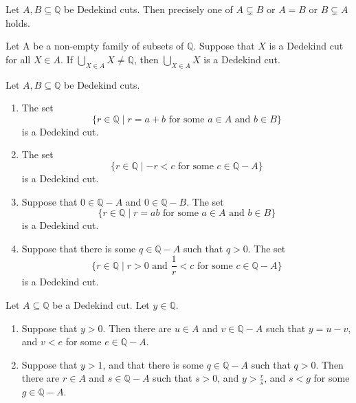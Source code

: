 \begin{lemma} %
	\label{cuts:l:trichotomy}
	Let $A, B \subseteq \mathbb{Q}$ be Dedekind cuts. Then precisely one of $A \subsetneq B$ or $A = B$ or $B \subsetneq A$ holds.
\end{lemma}

\begin{lemma} %
	Let A be a non-empty family of subsets of $\mathbb{Q}$. Suppose that $X$ is a Dedekind cut for all $X \in A$. If $\bigcup_{X \in A} X \neq \mathbb{Q}$, then $\bigcup_{X \in A} X$ is a Dedekind cut.
\end{lemma}

\begin{lemma} %
	\label{cuts:l:real_req}
	Let $A, B \subseteq \mathbb{Q}$ be Dedekind cuts.
	\begin{enumerate}
		\item \label{cuts:l:real_req:1}
		      The set
		      $$
			      \{ r \in \mathbb{Q} \mid r=a + b \text{ for some } a \in A \text{ and } b \in B \}
		      $$
		      is a Dedekind cut.
		\item \label{cuts:l:real_req:2}
		      The set
		      $$
			      \{ r \in \mathbb{Q} \mid -r < c \text{ for some } c \in \mathbb{Q} - A \}
		      $$
		      is a Dedekind cut.
		\item \label{cuts:l:real_req:3}
		      Suppose that $0 \in \mathbb{Q} - A$ and $0 \in \mathbb{Q} - B$. The set
		      $$
			      \{ r \in \mathbb{Q} \mid r = a b \text{ for some } a \in A \text{ and } b \in B \}
		      $$
		      is a Dedekind cut.
		\item \label{cuts:l:real_req:4}
		      Suppose that there is some $q \in \mathbb{Q} - A$ such that $q > 0$. The set
		      $$
			      \{ r \in \mathbb{Q} \mid r > 0 \text{ and } \frac{1}{r} < c \text{ for some } c \in \mathbb{Q} - A \}
		      $$
		      is a Dedekind cut.
	\end{enumerate}
\end{lemma}

\begin{lemma} %
	\label{cuts:l:aprops}
	Let $A \subseteq \mathbb{Q}$ be a Dedekind cut. Let $y \in \mathbb{Q}$.
	\begin{enumerate}
		\item Suppose that $y > 0$. Then there are $u \in A$ and $v \in \mathbb{Q}-A$ such that $y = u - v$, and $v < e$ for some $e \in \mathbb{Q} - A$.
		\item Suppose that $y > 1$, and that there is some $q \in \mathbb{Q} - A$ such that $q > 0$. Then there are $r \in A$ and $s \in \mathbb{Q} - A$ such that $s > 0$, and $y > \frac{r}{s}$, and $s < g$ for some $g \in \mathbb{Q} - A$.
	\end{enumerate}
\end{lemma}


